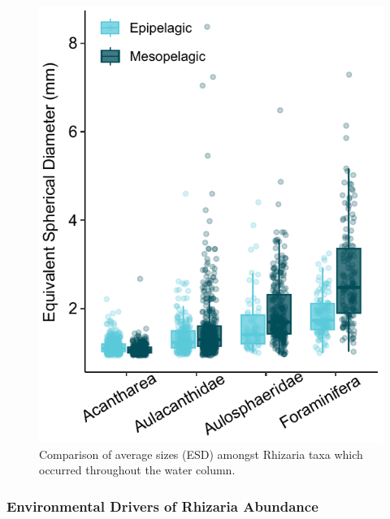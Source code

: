 \documentclass[
]{article}
\begin{document}
\begin{figure}[H]

{\centering \includegraphics{images/09_size-comp.pdf}

}

\caption{Comparison of average sizes (ESD) amongst Rhizaria taxa which
occurred throughout the water column.}

\end{figure}%

\subsubsection{Environmental Drivers of Rhizaria
Abundance}\label{environmental-drivers-of-rhizaria-abundance}
\end{document}
